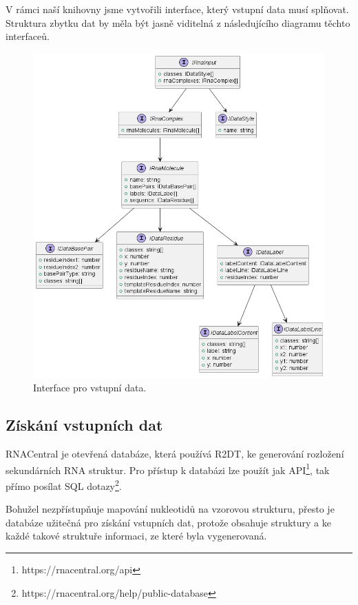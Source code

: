 V rámci naší knihovny jsme vytvořili interface, který vstupní data musí
splňovat. Struktura zbytku dat by měla být jasně viditelná z následujícího
diagramu těchto interfaceů.

\begin{figure}[H]
  \centering
  \includegraphics[width=145mm]{../img/kap03/rnaInput.png}
  \caption{Interface pro vstupní data.}
\end{figure}

\subsection{Získání vstupních dat}

RNACentral je otevřená databáze, která používá R2DT, ke generování rozložení
sekundárních RNA struktur. Pro přístup k databázi lze použít jak
API\footnote{https://rnacentral.org/api}, tak přímo posílat SQL
dotazy\footnote{https://rnacentral.org/help/public-database}.

Bohužel nezpřístupňuje mapování nukleotidů na vzorovou strukturu, přesto je
databáze užitečná pro získání vstupních dat, protože obsahuje struktury a ke
každé takové struktuře informaci, ze které byla vygenerovaná. 

